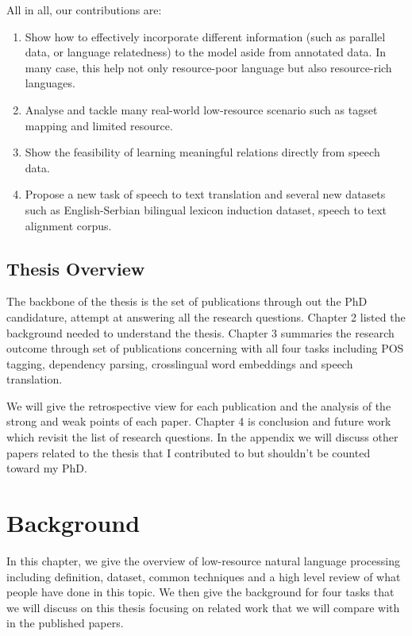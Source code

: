 \documentclass[12pt,twoside,final,hidelinks]{ltthesis}
\theoremstyle{definition}
\begin{document}
All in all, our contributions are:
\begin{enumerate}
\item Show how to effectively incorporate different information (such as parallel data, or language relatedness) to the model aside from annotated data. In many case, this help not only resource-poor language but also resource-rich languages. 
\item Analyse and tackle many real-world low-resource scenario such as tagset mapping and limited resource. 
\item Show the feasibility of learning meaningful relations directly from speech data.
\item Propose a new task of speech to text translation and several new datasets such as English-Serbian bilingual lexicon induction dataset, speech to text alignment corpus. 
\end{enumerate}

\section{Thesis Overview}
The backbone of the thesis is the set of publications through out the PhD candidature, attempt at answering all the research questions. 
Chapter 2 listed the background needed to understand the thesis. Chapter 3 summaries the research outcome 
through set of publications concerning with all four tasks including POS tagging, dependency parsing, crosslingual word embeddings and speech translation. 

We will give the retrospective view for each publication and the analysis of the strong and weak points of each paper. Chapter 4 is conclusion and future work which revisit the list of research questions. In the appendix we will discuss other papers related to the thesis that I contributed to but shouldn't be counted toward my PhD. 
%

\chapter{Background}
In this chapter, we give the overview of low-resource natural language processing including definition, dataset, common techniques and a high level review of what people have done in this topic. We then give the background for four tasks that we will discuss on this thesis focusing on related work that we will compare with in the published papers. 
\end{document}
